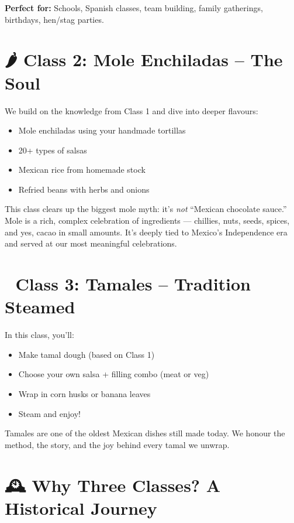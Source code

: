 \documentclass[12pt]{article}
\begin{document}
\textbf{Perfect for:} Schools, Spanish classes, team building, family gatherings, birthdays, hen/stag parties.

\vspace{1em}
\section*{🌶️ Class 2: Mole Enchiladas – The Soul}

We build on the knowledge from Class 1 and dive into deeper flavours:
\begin{itemize}
\item Mole enchiladas using your handmade tortillas
\item 20+ types of salsas
\item Mexican rice from homemade stock
\item Refried beans with herbs and onions
\end{itemize}

This class clears up the biggest mole myth: it’s \emph{not} “Mexican chocolate sauce.” Mole is a rich, complex celebration of ingredients — chillies, nuts, seeds, spices, and yes, cacao in small amounts. It’s deeply tied to Mexico’s Independence era and served at our most meaningful celebrations.

\vspace{1em}
\section*{🌽 Class 3: Tamales – Tradition Steamed}

In this class, you’ll:
\begin{itemize}
\item Make tamal dough (based on Class 1)
\item Choose your own salsa + filling combo (meat or veg)
\item Wrap in corn husks or banana leaves
\item Steam and enjoy!
\end{itemize}

Tamales are one of the oldest Mexican dishes still made today. We honour the method, the story, and the joy behind every tamal we unwrap.

\vspace{1em}
\section*{🕰️ Why Three Classes? A Historical Journey}
\end{document}
